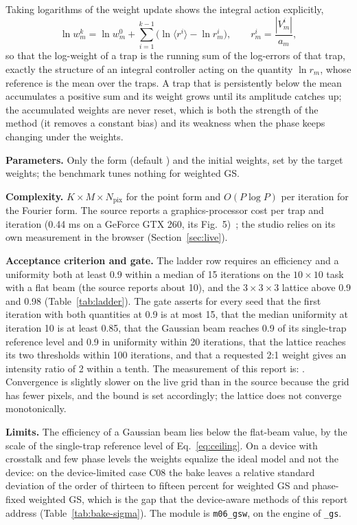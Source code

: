 Taking logarithms of the weight update shows the integral action explicitly,
\begin{equation}
\ln w_m^{k}=\ln w_m^{0}+\sum_{i=1}^{k-1}\Big(\ln\langle r^{i}\rangle-\ln r_m^{i}\Big),\qquad r_m^{i}=\frac{|V_m^{i}|}{a_m},
\label{eq:m06-integral}
\end{equation}
so that the log-weight of a trap is the running sum of the log-errors of that trap, exactly the structure of an integral controller acting on the quantity $\ln r_m$, whose reference is the mean over the traps. A trap that is persistently below the mean accumulates a positive sum and its weight grows until its amplitude catches up; the accumulated weights are never reset, which is both the strength of the method (it removes a constant bias) and its weakness when the phase keeps changing under the weights.

\textbf{Parameters.} Only the form (default \texttt{}) and the initial weights, set by the target weights; the benchmark tunes nothing for weighted GS.

\textbf{Complexity.} $K\times M\times N_{\mathrm{pix}}$ for the point form and $O(P\log P)$ per iteration for the Fourier form. The source reports a graphics-processor cost per trap and iteration (0.44 ms on a GeForce GTX 260, its Fig.~5)~\cite{bianchi2010}; the studio relies on its own measurement in the browser (Section~\ref{sec:live}).

\textbf{Acceptance criterion and gate.} The ladder row requires an efficiency and a uniformity both at least 0.9 within a median of 15 iterations on the $10\times10$ task with a flat beam (the source reports about 10), and the $3\times3\times3$ lattice above 0.9 and 0.98 (Table~\ref{tab:ladder}). The gate asserts for every seed that the first iteration with both quantities at 0.9 is at most 15, that the median uniformity at iteration 10 is at least 0.85, that the Gaussian beam reaches 0.9 of its single-trap reference level and 0.9 in uniformity within 20 iterations, that the lattice reaches its two thresholds within 100 iterations, and that a requested 2:1 weight gives an intensity ratio of 2 within a tenth. The measurement of this report is: . Convergence is slightly slower on the live grid than in the source because the grid has fewer pixels, and the bound is set accordingly; the lattice does not converge monotonically.

\textbf{Limits.} The efficiency of a Gaussian beam lies below the flat-beam value, by the scale of the single-trap reference level of Eq.~\eqref{eq:ceiling}. On a device with crosstalk and few phase levels the weights equalize the ideal model and not the device: on the device-limited case C08 the bake leaves a relative standard deviation of the order of thirteen to fifteen percent for weighted GS and phase-fixed weighted GS, which is the gap that the device-aware methods of this report address (Table~\ref{tab:bake-sigma}). The module is \texttt{m06\_gsw}, on the engine of \texttt{\_gs}.
